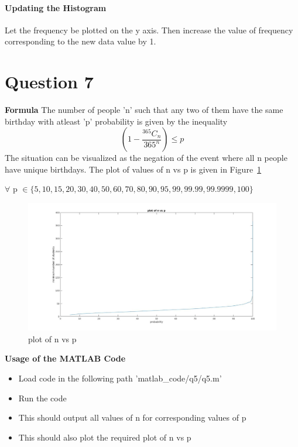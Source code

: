 \documentclass[12pt]{article}
\begin{document}
\paragraph{Updating the Histogram\newline}
Let the frequency be plotted on the y axis.\newline
Then increase the value of frequency corresponding to the new data value by 1.\newline


\newpage
\section{Question 7}
\textbf{Formula}
\newline
The number of people 'n' such that any two of them have the same birthday with atleast 'p' probability is given by the inequality
$$\left(1-\frac{^{365}C_n}{365^n}\right) \leq p$$
The situation can be visualized as the negation of the event where all n people have unique birthdays.
\newline
The plot of values of n vs p is given in Figure~\ref{fig:7.1}
\begin{flushright}
$\forall$ p $\in \{5, 10, 15, 20, 30, 40, 50, 60, 70, 80, 90, 95, 99, 99.99, 99.9999, 100\}$
\end{flushright}
\begin{figure} [h!]
\includegraphics[width=\linewidth]{plot.jpg}
\caption{plot of n vs p}
\label{fig:7.1}
\end{figure}
\textbf{Usage of the MATLAB Code}
\begin{itemize}
\item Load code in the following path 'matlab\_code/q5/q5.m'
\item Run the code
\item This should output all values of n for corresponding values of p
\item This should also plot the required plot of n vs p
\end{itemize}
\end{document}
